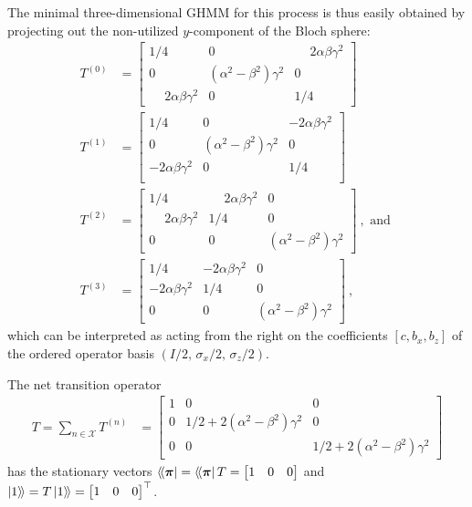 \documentclass[prx,nofootinbib,onecolumn,showkeys,groupaddress,preprintnumbers,floatfix,
superscriptaddress]{revtex4-1}
\newcommand{\stationary}{\boldsymbol{\pi}}
\newcommand{\dbra}[1]{\bra{ \! \langle #1}}
\newcommand{\dket}[1]{\ket{ #1 \rangle \!}}
\begin{document}
The minimal three-dimensional GHMM for this process is thus easily obtained by projecting out the non-utilized $y$-component of the Bloch sphere:
%
\begin{align}
T^{(0)} &= 
\begin{bmatrix}
    1/4 & 0 & \phantom{-}2\alpha \beta \gamma^2 \\
    0 & (\alpha^2 - \beta^2)\gamma^2  & 0 \\
    \phantom{-} 2\alpha \beta \gamma^2 & 0 & 1/4 
\end{bmatrix} \\
T^{(1)} &= 
\begin{bmatrix}
    1/4 & 0 & -2\alpha \beta \gamma^2 \\
    0 & (\alpha^2 - \beta^2)\gamma^2  & 0 \\
    -2\alpha \beta \gamma^2 & 0 & 1/4 \\
\end{bmatrix} \\
T^{(2)} &= 
\begin{bmatrix}
    1/4 & \phantom{-}2\alpha \beta \gamma^2 &  0 \\
    \phantom{-}2\alpha \beta \gamma^2 & 1/4 &  0 \\
    0 & 0 & (\alpha^2 - \beta^2)\gamma^2 
\end{bmatrix} ~, \text{ and } \\
T^{(3)} 
&= 
\begin{bmatrix}
    1/4 & -2\alpha \beta \gamma^2 & 0 \\
    -2\alpha \beta \gamma^2 & 1/4 & 0 \\
    0 & 0 & (\alpha^2 - \beta^2)\gamma^2  
\end{bmatrix} ~,
\end{align}
which can be interpreted as acting from the right on the coefficients $[c,b_x, b_z]$ of the ordered operator basis $(I/2, \, \sigma_x/2, \, \sigma_z/2)$.

The net transition operator 
\begin{align}
T = \sum_{n \in \mathcal{X}} T^{(n)}
&= 
\begin{bmatrix}
    1 & 0 & 0 \\
    0 & 1/2 + 2 (\alpha^2 - \beta^2)\gamma^2 & 0 \\
    0 & 0 & 1/2 + 2(\alpha^2 - \beta^2)\gamma^2 
\end{bmatrix}
\end{align}
has the stationary vectors $\dbra{\stationary} = \dbra{\stationary} T = \begin{bmatrix} 1 & 0 & 0 \end{bmatrix}$
and $\dket{1} = T \dket{1} = \begin{bmatrix}
    1 & 0 & 0
\end{bmatrix}^\top$.
\end{document}

